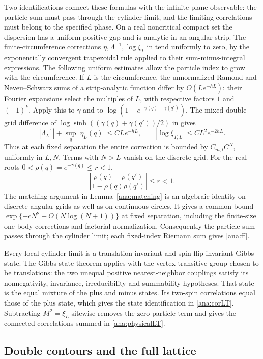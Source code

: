 \documentclass[11pt]{article}
\numberwithin{equation}{section}
\theoremstyle{definition}
\begin{document}
Two identifications connect these formulas with the infinite-plane
observable: the particle sum must pass through the cylinder limit,
and the limiting correlations must belong to the specified phase. On a real noncritical compact set the dispersion has a
uniform positive gap and is analytic in an angular strip. The
finite-circumference corrections \(\eta,\Lambda^{-1},\log\xi_T\)
in \cite{BL} tend uniformly to zero, by the exponentially convergent
trapezoidal rule applied to their sum-minus-integral expressions.
The following uniform estimates allow the particle index to grow
with the circumference. If \(L\) is the circumference, the unnormalized Ramond and
Neveu--Schwarz sums of a strip-analytic function differ by
\(O(Le^{-hL})\): their Fourier expansions select the multiples of
\(L\), with respective factors \(1\) and \((-1)^k\).
Apply this to \(\gamma\) and to
\(\log(1-e^{-\gamma(q)-\gamma(q')})\). The mixed double-grid
difference of \(\log\sinh((\gamma(q)+\gamma(q'))/2)\) in
\cite[(25)]{BL} gives
\[
 |\Lambda_L^{-1}|+\sup_q|\eta_L(q)|\le CLe^{-hL},\qquad
 |\log\xi_{T,L}|\le CL^2e^{-2hL}.
\]
Thus at each fixed separation the entire correction is bounded by
\(C_{m,l}C^N\), uniformly in \(L,N\). Terms with \(N>L\)
vanish on the discrete grid.
For the real roots \(0<\rho(q)=e^{-\gamma(q)}\le r<1\),
\[
 \left|\frac{\rho(q)-\rho(q')}{1-\rho(q)\rho(q')}\right|\le r<1.
\]
The matching argument in Lemma~\ref{ana:matching} is an algebraic
identity on discrete angular grids as well as on continuous circles.
It gives a common bound
\(\exp\{-cN^2+O(N\log(N+1))\}\) at fixed separation, including
the finite-size one-body corrections and factorial normalization.
Consequently the particle sum passes through the cylinder limit;
each fixed-index Riemann sum gives \eqref{ana:ff}.

Every local cylinder limit is a translation-invariant and spin-flip
invariant Gibbs state. The Gibbs-state theorem
\cite[Theorem 1]{Raoufi} applies with the vertex-transitive group
chosen to be translations: the two unequal positive nearest-neighbor
couplings satisfy its nonnegativity, invariance, irreducibility and
summability hypotheses. That state is the equal mixture of the plus
and minus states. Its two-spin correlations equal those of the plus
state, which gives the state identification in \eqref{ana:corLT}.
Subtracting \(M^2=\xi_L\) sitewise removes the zero-particle term and
gives the connected correlations summed in \eqref{ana:physicalLT}.

\subsection{Double contours and the full lattice}
\label{ana:double}
\end{document}
